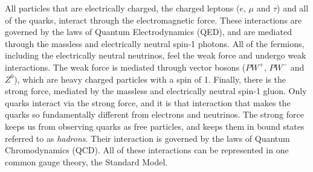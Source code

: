 All particles that are electrically charged, the charged leptons ($e$, $\mu$ and $\tau$) and all of the quarks, interact through the electromagnetic force. These interactions are governed by the laws of Quantum Electrodynamics (QED), and are mediated through the massless and electrically neutral spin-1 photons. All of the fermions, including the electrically neutral neutrinos, feel the weak force and undergo weak interactions. The weak force is mediated through vector bosons ($PW^+$, $PW^-$ and $Z^0$), which are heavy charged particles with a spin of 1. Finally, there is the strong force, mediated by the massless and electrically neutral spin-1 gluon. Only quarks interact via the strong force, and it is that interaction that makes the quarks so fundamentally different from electrons and neutrinos. The strong force keeps us from observing quarks as free particles, and keeps them in bound states referred to as \emph{hadrons}. Their interaction is governed by the laws of Quantum Chromodynamics (QCD). All of these interactions can be represented in one common gauge theory, the Standard Model.

